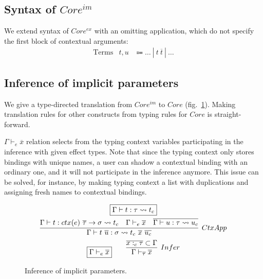 \documentclass[acmsmall]{acmart}
\newcommand{\mathframebox}[1]{\framebox{$\displaystyle #1$}}
\newcommand{\vor}{~|~}
\newcommand{\ap}{~}
\newcommand{\ctx}[1]{ctx(#1)~}
\newcommand{\step}{\rightsquigarrow}
\begin{document}
\subsection{Syntax of $Core^{im}$}

We extend syntax of $Core^{ex}$ with an omitting application, which do not specify the first block of contextual arguments:
\[
    \begin{array}{lcc}
        \text{Terms} & t, u &\Coloneqq \ldots \vor t\ap\overline{t} \vor \ldots
    \end{array}
\]

\subsection{Inference of implicit parameters} \label{subsec:inference}

We give a type-directed translation from $Core^{im}$ to $Core$ (fig.\ \ref{fig:fim-fex-inference}).
Making translation rules for other constructs from typing rules for $Core$ is straight-forward.

$\Gamma\vdash_e \overline{x}$ relation selects from the typing context variables participating in the inference with given effect types.
Note that since the typing context only stores bindings with unique names, a user can shadow a contextual binding with an ordinary one, and it will not participate in the inference anymore.
This issue can be solved, for instance, by making typing context a list with duplications and assigning fresh names to contextual bindings.

\begin{figure}
    \begin{gather*}
        \mathframebox{\Gamma\vdash t : \tau \step t_{c}} \\
        \infer[CtxApp]{
            \Gamma\vdash t\ap\overline{u} : \sigma \step t_{c} \ap \overline{x}\ap\overline{u_{c}}
        }{
            \Gamma\vdash t : \ctx{e} \overline{\tau} \to \sigma \step t_{c} &
            \Gamma\vdash_e\overline{x} &
            \overline{\Gamma\vdash u : \tau \step u_{c}}
        } \\
        \mathframebox{\Gamma\vdash_e \overline{x}}
        \text{\hspace{2em}}
        \infer[Infer]{\Gamma\vdash_{\overline{\tau}} \overline{x}}{\overline{x :_c \tau}\subset \Gamma}
    \end{gather*}
    \caption{Inference of implicit parameters.}
    \label{fig:fim-fex-inference}
\end{figure}
\end{document}
